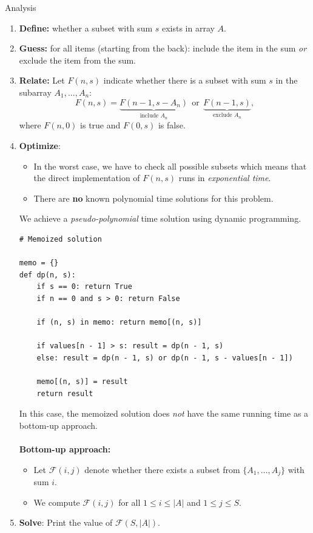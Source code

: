 \documentclass{cspresentation}
\DeclareMathOperator{\lortext}{\,\textrm{or}\,}
\begin{document}
\begin{frame}{Analysis}
    \begin{enumerate}
        \item \textbf{Define:} whether a subset with sum $s$ exists in array $A$.
        \item \textbf{Guess:} for all items (starting from the back): include the item in the sum \textit{or} exclude the item from the sum.
        \item \textbf{Relate:} Let $F(n,s)$ indicate whether there is a subset with sum $s$ in the subarray $A_1,\ldots,A_n$: 
        $$F(n,s)=\underbrace{F(n-1,s-A_n)}_{\text{include $A_n$}}\lortext\underbrace{F(n-1,s)}_{\text{exclude $A_n$}},$$
        where $F(n,0)$ is true and $F(0,s)$ is false.
        \framebreak
        \item \textbf{Optimize}:
        \begin{itemize}
            \item In the worst case, we have to check all possible subsets which means that the direct implementation of $F(n,s)$ runs in \textit{exponential time}. \item There are \textbf{no} known polynomial time solutions for this problem.
        \end{itemize}
        We achieve a \textit{pseudo-polynomial} time solution using dynamic programming.
        \framebreak
\begin{lstlisting}[language=iPython,mathescape=true]
# Memoized solution

memo = {}
def dp(n, s):
    if s == 0: return True
    if n == 0 and s > 0: return False
    
    if (n, s) in memo: return memo[(n, s)]
    
    if values[n - 1] > s: result = dp(n - 1, s)
    else: result = dp(n - 1, s) or dp(n - 1, s - values[n - 1])
    
    memo[(n, s)] = result
    return result
\end{lstlisting}
In this case, the memoized solution does \textit{not} have the same running time as a bottom-up approach.\\~\\
\textbf{Bottom-up approach:}
\begin{itemize}
    \item Let $\mathcal{F}(i,j)$ denote whether there exists a subset from $\{A_1,\ldots,A_j\}$ with sum $i$.
    \item We compute $\mathcal{F}(i,j)$ for all $1 \leq i \leq |A|$ and $1 \leq j \leq S$.
\end{itemize}
\item \textbf{Solve}: Print the value of $\mathcal{F}\left(S,|A|\right)$.
    \end{enumerate}
\end{frame}
\end{document}
